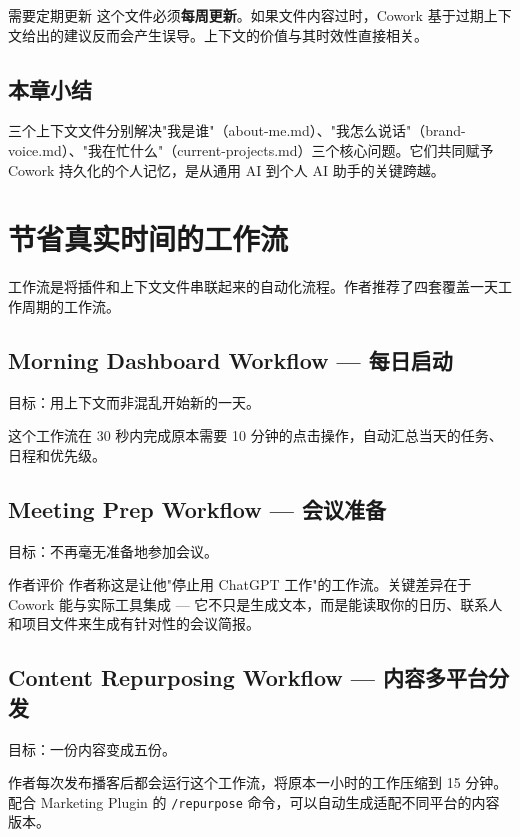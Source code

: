 \documentclass[a4paper]{article}
\begin{document}
\begin{warningbox}{需要定期更新}
这个文件必须\textbf{每周更新}。如果文件内容过时，Cowork 基于过期上下文给出的建议反而会产生误导。上下文的价值与其时效性直接相关。
\end{warningbox}

\subsection{本章小结}

三个上下文文件分别解决"我是谁"（about-me.md）、"我怎么说话"（brand-voice.md）、"我在忙什么"（current-projects.md）三个核心问题。它们共同赋予 Cowork 持久化的个人记忆，是从通用 AI 到个人 AI 助手的关键跨越。

\section{节省真实时间的工作流}

工作流是将插件和上下文文件串联起来的自动化流程。作者推荐了四套覆盖一天工作周期的工作流。

\subsection{Morning Dashboard Workflow --- 每日启动}

目标：用上下文而非混乱开始新的一天。

这个工作流在 30 秒内完成原本需要 10 分钟的点击操作，自动汇总当天的任务、日程和优先级。

\subsection{Meeting Prep Workflow --- 会议准备}

目标：不再毫无准备地参加会议。

\begin{knowledgebox}{作者评价}
作者称这是让他"停止用 ChatGPT 工作"的工作流。关键差异在于 Cowork 能与实际工具集成 --- 它不只是生成文本，而是能读取你的日历、联系人和项目文件来生成有针对性的会议简报。
\end{knowledgebox}

\subsection{Content Repurposing Workflow --- 内容多平台分发}

目标：一份内容变成五份。

作者每次发布播客后都会运行这个工作流，将原本一小时的工作压缩到 15 分钟。配合 Marketing Plugin 的 \texttt{/repurpose} 命令，可以自动生成适配不同平台的内容版本。
\end{document}

